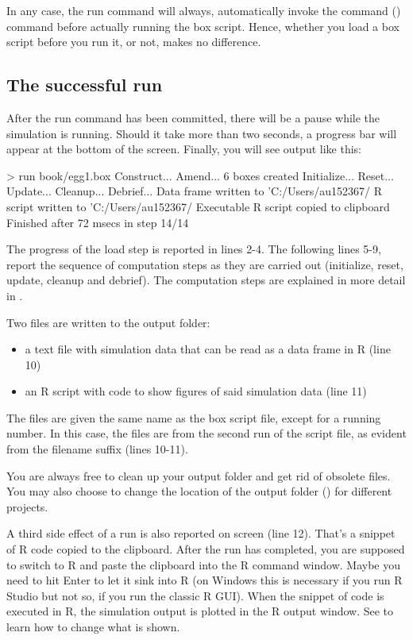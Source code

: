 In any case, the run command will always, automatically invoke the  command () command before actually running the box script. Hence, whether you load a box script before you run it, or not, makes no difference.

\subsection{The successful run}
After the run command has been committed, there will be a pause while the simulation is running. Should it take more than two seconds, a progress bar will appear at the bottom of the screen. Finally, you will see output like this:
\lstset{numbers=left}
\begin{usdialog}
> run book/egg1.box
Construct...
Amend...
6 boxes created
Initialize...
Reset...
Update...
Cleanup...
Debrief...
Data frame written to 'C:/Users/au152367/%
R script written to 'C:/Users/au152367/%
Executable R script copied to clipboard
Finished after 72 msecs in step 14/14
\end{usdialog}
\lstset{numbers=none}

The progress of the load step is reported in lines 2-4. The following lines 5-9, report the sequence of computation steps as they are carried out (initialize, reset, update, cleanup and debrief). The computation steps are explained in more detail in .

Two files are written to the output folder:
\begin{itemize}
\item a text file with simulation data that can be read as a data frame in R (line 10) 
\item an R script with code to show figures of said simulation data (line 11)
\end{itemize}
The files are given the same name as the box script file, except for a running number. In this case, the files are from the second run of the  script file, as evident from the filename suffix  (lines 10-11). 

You are always free to clean up your output folder and get rid of obsolete files. You may also choose to change the location of the output folder () for different projects.

A third side effect of a run is also reported on screen (line 12). That's a snippet of R code copied to the clipboard. After the run has completed, you are supposed to switch to R and paste the clipboard into the R command window. Maybe you need to hit Enter to let it sink into R (on Windows this is necessary if you run R Studio but not so, if you run the classic R GUI). When the snippet of code is executed in R, the simulation output is plotted in the R output window. See  to learn how to change what is shown.

